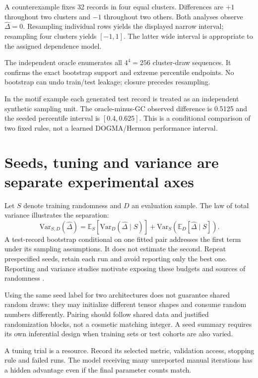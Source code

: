A counterexample fixes 32 records in four equal clusters. Differences are
$+1$ throughout two clusters and $-1$ throughout two others.
Both analyses observe $\widehat\Delta=0$. Resampling individual rows yields
the displayed narrow interval; resampling four clusters yields $[-1,1]$.
The latter wide interval is appropriate to the assigned dependence model.

\par\medskip\noindent\par\medskip
The independent oracle enumerates all $4^4=256$ cluster-draw sequences.
It confirms the exact bootstrap support and extreme percentile endpoints.
No bootstrap can undo train/test leakage; closure precedes resampling.

In the motif example each generated test record is treated as an independent
synthetic sampling unit. The oracle-minus-GC observed difference is 0.5125
and the seeded percentile interval is $[0.4,0.625]$. This is a conditional
comparison of two fixed rules, not a learned DOGMA/Hermon performance interval.

\section{Seeds, tuning and variance are separate experimental axes}
Let $S$ denote training randomness and $D$ an evaluation sample.
The law of total variance illustrates the separation:
\[
\mathrm{Var}_{S,D}(\widehat\Delta)
=\mathbb E_S[\mathrm{Var}_D(\widehat\Delta\mid S)]
+\mathrm{Var}_S(\mathbb E_D[\widehat\Delta\mid S]).
\]
A test-record bootstrap conditional on one fitted pair addresses the first
term under its sampling assumptions. It does not estimate the second.
Repeat prespecified seeds, retain each run and avoid reporting only the best one.
Reporting and variance studies motivate exposing these budgets and sources
of randomness \cite{dodge,variance}.

Using the same seed label for two architectures does not guarantee shared
random draws: they may initialize different tensor shapes and consume random
numbers differently. Pairing should follow shared data and justified
randomization blocks, not a cosmetic matching integer. A seed summary
requires its own inferential design when training sets or test cohorts
are also varied.

A tuning trial is a resource. Record its selected metric, validation access,
stopping rule and failed runs. The model receiving many unreported manual
iterations has a hidden advantage even if the final parameter counts match.

